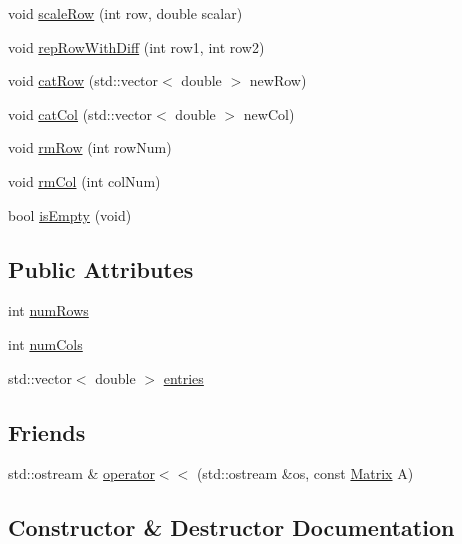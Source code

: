\begin{DoxyCompactItemize}
\item 
void \mbox{\hyperlink{class_matrix_a37dba2b6d455b7d44ced045ce97a9e05}{scale\+Row}} (int row, double scalar)
\item 
void \mbox{\hyperlink{class_matrix_a1385f13513c2f00cf9dbe9eb45ccbc01}{rep\+Row\+With\+Diff}} (int row1, int row2)
\item 
void \mbox{\hyperlink{class_matrix_a8e3776c15fa1abfd2ffcbd593098131f}{cat\+Row}} (std\+::vector$<$ double $>$ new\+Row)
\item 
void \mbox{\hyperlink{class_matrix_a1d288589b025eb2dad477b9699a79e9f}{cat\+Col}} (std\+::vector$<$ double $>$ new\+Col)
\item 
void \mbox{\hyperlink{class_matrix_aab389448930cfd4b32158aa58ef5f87a}{rm\+Row}} (int row\+Num)
\item 
void \mbox{\hyperlink{class_matrix_ac47f9d15d021312e0a33a341cc1e8032}{rm\+Col}} (int col\+Num)
\item 
bool \mbox{\hyperlink{class_matrix_a8001c85cc9d6a706e659f972ea35ff93}{is\+Empty}} (void)
\end{DoxyCompactItemize}
\subsection*{Public Attributes}
\begin{DoxyCompactItemize}
\item 
int \mbox{\hyperlink{class_matrix_a0eb658c64c749da9cc9705dc232fcb85}{num\+Rows}}
\item 
int \mbox{\hyperlink{class_matrix_a1ddb385f8482c80f98e5cdbf914ba11a}{num\+Cols}}
\item 
std\+::vector$<$ double $>$ \mbox{\hyperlink{class_matrix_aac8f997f1cfa7b0a0ed1d11b554a8c24}{entries}}
\end{DoxyCompactItemize}
\subsection*{Friends}
\begin{DoxyCompactItemize}
\item 
std\+::ostream \& \mbox{\hyperlink{class_matrix_ac7214274c9ef83ebef022af7225ac068}{operator$<$$<$}} (std\+::ostream \&os, const \mbox{\hyperlink{class_matrix}{Matrix}} A)
\end{DoxyCompactItemize}


\subsection{Constructor \& Destructor Documentation}
\mbox{\label{class_matrix_a2dba13c45127354c9f75ef576f49269b}} 

